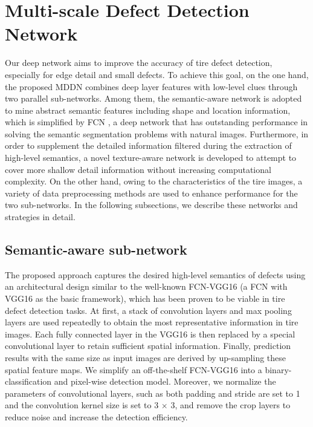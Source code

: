 \documentclass{article}
\begin{document}

\section{Multi-scale Defect Detection Network}
\label{sec:format}

Our deep network aims to improve the accuracy of tire defect detection, especially for edge detail and small defects. To achieve this goal, on the one hand, the proposed MDDN combines deep layer features with low-level clues through two parallel sub-networks. Among them, the semantic-aware network is adopted to mine abstract semantic features including shape and location information, which is simplified by FCN \cite{long2015fully}, a deep network that has outstanding performance in solving the semantic segmentation problems with natural images. Furthermore, in order to supplement the detailed information filtered during the extraction of high-level semantics, a novel texture-aware network is developed to attempt to cover more shallow detail information without increasing computational complexity. On the other hand, owing to the characteristics of the tire images, a variety of data preprocessing methods are used to enhance performance for the two sub-networks. In the following subsections, we describe these networks and strategies in detail.

\subsection{Semantic-aware sub-network}
\label{Semantic-aware sub-network}
The proposed approach captures the desired high-level semantics of defects using an architectural design similar to the well-known FCN-VGG16 (a FCN with VGG16 as the basic framework), which has been proven to be viable in tire defect detection tasks. At first, a stack of convolution layers and max pooling layers are used repeatedly to obtain the most representative information in tire images. Each fully connected layer in the VGG16 is then replaced by a special convolutional layer to retain sufficient spatial information. Finally, prediction results with the same size as input images are derived by up-sampling these spatial feature maps. We simplify an off-the-shelf FCN-VGG16 into a binary-classification and pixel-wise detection model. Moreover, we normalize the parameters of convolutional layers, such as both padding and stride are set to 1 and the convolution kernel size is set to 3 $\times$ 3, and remove the crop layers to reduce noise and increase the detection efficiency.
\end{document}

